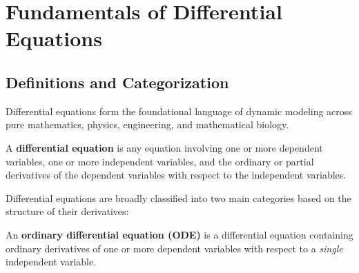\documentclass[11pt, a4paper, openany, oneside]{book}
\begin{document}
\begin{titlepage}
\end{titlepage}

\newpage
\tableofcontents
\newpage

\chapter{Fundamentals of Differential Equations}

\section{Definitions and Categorization}

Differential equations form the foundational language of dynamic modeling across pure mathematics, physics, engineering, and mathematical biology.

\begin{definitionbox}
A \textbf{differential equation} is any equation involving one or more dependent variables, one or more independent variables, and the ordinary or partial derivatives of the dependent variables with respect to the independent variables.
\end{definitionbox}

Differential equations are broadly classified into two main categories based on the structure of their derivatives:

\begin{definitionbox}
An \textbf{ordinary differential equation (ODE)} is a differential equation containing ordinary derivatives of one or more dependent variables with respect to a \emph{single} independent variable.
\end{definitionbox}
\end{document}
